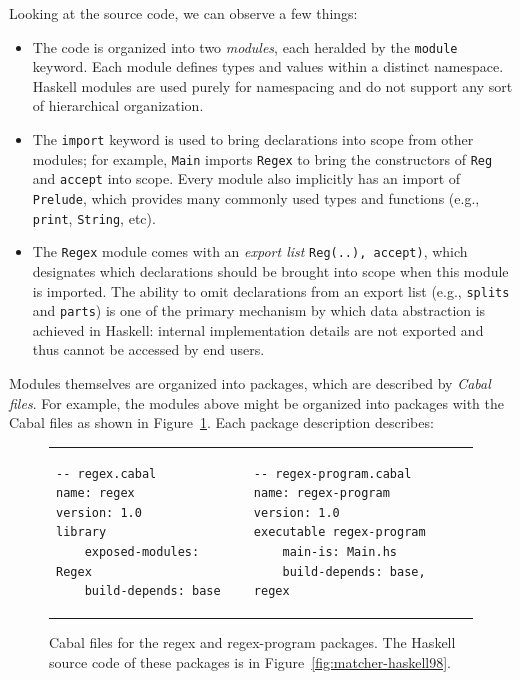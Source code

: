 Looking at the source code, we can observe a few things:

\begin{itemize}
    \item The code is organized into two \emph{modules}, each heralded
    by the \verb|module| keyword.  Each module defines types and values
    within a distinct namespace.  Haskell modules are used purely for
    namespacing and do not support any sort of hierarchical organization.

    \item The \verb|import| keyword is used to bring declarations into
    scope from other modules; for example, \verb|Main| imports \verb|Regex|
    to bring the constructors of \verb|Reg| and \verb|accept| into scope.
    Every module also implicitly has an import of \verb|Prelude|, which
    provides many commonly used types and functions (e.g., \verb|print|,
    \verb|String|, etc).

    \item The \verb|Regex| module comes with an \emph{export list}
    \verb|Reg(..), accept)|, which designates which declarations should
    be brought into scope when this module is imported.  The ability to
    omit declarations from an export list (e.g., \verb|splits| and \verb|parts|)
    is one of the primary mechanism by which data abstraction is achieved in
    Haskell: internal implementation details are not exported and thus
    cannot be accessed by end users.
\end{itemize}
Modules themselves are organized into packages, which are described by
\emph{Cabal files}.  For example, the modules above might be organized into
packages with the Cabal files as shown in Figure~\ref{fig:matcher-packages}.
Each package description describes:

\begin{figure}
\begin{tabular}{p{} p{}}
\begin{lstlisting}[language=Cabal]
-- regex.cabal
name: regex
version: 1.0
library
    exposed-modules: Regex
    build-depends: base
\end{lstlisting}
&
\begin{lstlisting}[language=Cabal]
-- regex-program.cabal
name: regex-program
version: 1.0
executable regex-program
    main-is: Main.hs
    build-depends: base, regex
\end{lstlisting}
\end{tabular}
\caption{Cabal files for the regex and regex-program packages. The Haskell source code
of these packages is in Figure~\ref{fig:matcher-haskell98}.}
\label{fig:matcher-packages}
\end{figure}

